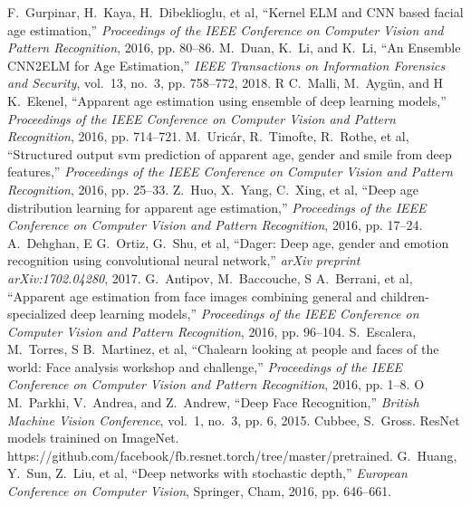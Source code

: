 \documentclass[journal]{IEEEtran}
\begin{document}
\begin{thebibliography}{1}
F.~Gurpinar, H.~Kaya, H.~Dibeklioglu, et al, ``Kernel ELM and CNN based facial age estimation,'' \emph{Proceedings of the IEEE Conference on Computer Vision and Pattern Recognition}, 2016, pp. 80--86.
M.~Duan, K.~Li, and K.~Li, ``An Ensemble CNN2ELM for Age Estimation,'' \emph{IEEE Transactions on Information Forensics and Security}, vol.~13, no.~3, pp. 758--772, 2018.
R C.~Malli, M.~Aygün, and H K.~Ekenel, ``Apparent age estimation using ensemble of deep learning models,'' \emph{Proceedings of the IEEE Conference on Computer Vision and Pattern Recognition}, 2016, pp. 714--721.
M.~Uricár, R.~Timofte, R.~Rothe, et al, ``Structured output svm prediction of apparent age, gender and smile from deep features,'' \emph{Proceedings of the IEEE Conference on Computer Vision and Pattern Recognition}, 2016, pp. 25--33.
Z.~Huo, X.~Yang, C.~Xing, et al, ``Deep age distribution learning for apparent age estimation,'' \emph{Proceedings of the IEEE Conference on Computer Vision and Pattern Recognition}, 2016, pp. 17--24.
A.~Dehghan, E G.~Ortiz, G.~Shu, et al, ``Dager: Deep age, gender and emotion recognition using convolutional neural network,'' \emph{arXiv preprint arXiv:1702.04280}, 2017.
G.~Antipov, M.~Baccouche, S A.~Berrani, et al, ``Apparent age estimation from face images combining general and children-specialized deep learning models,'' \emph{Proceedings of the IEEE Conference on Computer Vision and Pattern Recognition}, 2016, pp. 96--104.
S.~Escalera, M.~Torres, S B.~Martinez, et al, ``Chalearn looking at people and faces of the world: Face analysis workshop and challenge,'' \emph{Proceedings of the IEEE Conference on Computer Vision and Pattern Recognition}, 2016, pp. 1--8.
O M.~Parkhi, V.~Andrea, and Z.~Andrew, ``Deep Face Recognition,'' \emph{British Machine Vision Conference}, vol.~1, no.~3, pp. 6, 2015.
Cubbee, S.~Gross. ResNet models trainined on ImageNet. https://github.com/facebook/fb.resnet.torch/tree/master/pretrained.
G.~Huang, Y.~Sun, Z.~Liu, et al, ``Deep networks with stochastic depth,'' \emph{European Conference on Computer Vision}, Springer, Cham, 2016, pp. 646--661.





\end{thebibliography}
\end{document}

